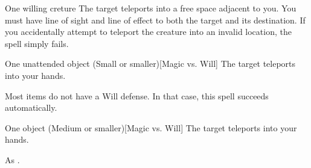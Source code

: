 \begin{spellheader}
    \spellrng{\rngmed}
\end{spellheader}
\begin{spelleffects}
    \begin{spelltarget}{One willing creture}
        \spelleffect The target teleports into a free space adjacent to you. You must have line of sight and line of effect to both the target and its destination. If you accidentally attempt to teleport the creature into an invalid location, the spell simply fails.
    \end{spelltarget}
\end{spelleffects}
\begin{spellfooter}
    
\end{spellfooter}

\begin{spellheader}
    \spellrng{\rngclose}
\end{spellheader}
\begin{spelleffects}
    \begin{spelltarget}{One unattended object (Small or smaller)}[Magic vs. Will]
        \spellsuccess The target teleports into your hands.
    \end{spelltarget}
\end{spelleffects}
\begin{spellfooter}
    \spellnotes Most items do not have a Will defense. In that case, this spell succeeds automatically.
\end{spellfooter}

\begin{spellheader}
    \spellrng{\rngmed}
\end{spellheader}
\begin{spelleffects}
    \begin{spelltarget}{One object (Medium or smaller)}[Magic vs. Will]
        \spelleffect The target teleports into your hands.
    \end{spelltarget}
\end{spelleffects}
\begin{spellfooter}
    \spellnotes As .
\end{spellfooter}

